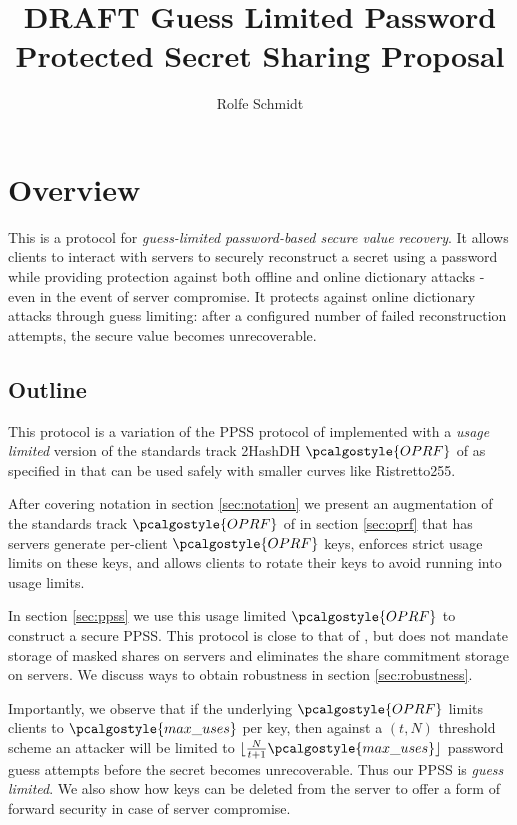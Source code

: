 \documentclass{article}
\title{DRAFT Guess Limited Password Protected Secret Sharing Proposal}
\author{Rolfe Schmidt}
\newcommand{\OPRF}{\pcalgostyle{OPRF}}
\newcommand{\maxuses}{\pcalgostyle{max\_uses}}
\begin{document}
\maketitle

\section{Overview}

This is a protocol for {\em guess-limited password-based secure value recovery}.
It allows clients to interact with servers to securely reconstruct a secret
using a password while providing protection against both offline and online
dictionary attacks - even in the event of server compromise. It protects against
online dictionary attacks through guess limiting: after a configured number of
failed reconstruction attempts, the secure value becomes unrecoverable.

\subsection{Outline}

This protocol is a variation of the PPSS protocol of \cite{jkkx} implemented
with a {\em usage limited} version of the standards track 2HashDH $\OPRF$ of
\cite{2hashdh} as specified in \cite{ietf-oprf} that can be used safely with
smaller curves like Ristretto255. 

After covering notation in section \ref{sec:notation} we present an augmentation
of the standards track $\OPRF$ of \cite{ietf-oprf} in section \ref{sec:oprf}
that has servers generate per-client $\OPRF$ keys, enforces strict usage limits
on these keys, and allows clients to rotate their keys to avoid running into
usage limits.

In section \ref{sec:ppss} we use this usage limited $\OPRF$ to construct a
secure PPSS. This protocol is close to that of \cite{jkkx}, but does not mandate
storage of masked shares on servers and eliminates the share commitment storage
on servers. We discuss ways to obtain robustness in section \ref{sec:robustness}. 

Importantly, we observe that if the underlying $\OPRF$ limits clients to
$\maxuses$ per key, then against a $(t,N)$ threshold scheme an attacker will be
limited to $\lfloor \frac{N}{t+1}\maxuses\rfloor$ password guess attempts before
the secret becomes unrecoverable. Thus our PPSS is {\em guess limited}. We also
show how keys can be deleted from the server to offer a form of forward security
in case of server compromise.
\end{document}
